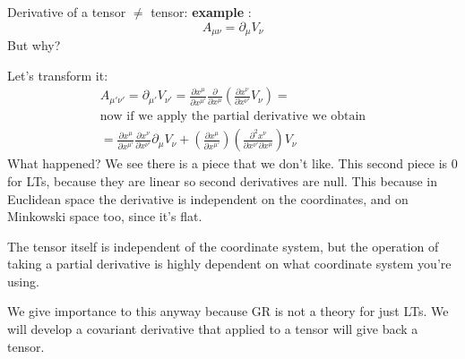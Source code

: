 Derivative of a tensor $\neq$ tensor:
\textbf{example} : 
\[
A_{\mu \nu } = \partial_{\mu }V_{\nu }
\]
But why? \par
Let's transform it:
\begin{gather*}
A_{\mu '\nu '} = \partial_{\mu '}V_{\nu '} = \frac{\partial x^{\mu }}{\partial x^{\mu '}} \frac{\partial }{\partial x^{\mu }} \left( \frac{\partial x^{\nu }}{\partial x^{\nu '}}V_{\nu }  \right) = \\
\text{now if we apply the partial derivative we obtain}\\
= \frac{\partial x^{\mu }}{\partial x^{\mu '}} \frac{\partial x^{\nu }}{\partial x^{\nu '}} \partial_{\mu } V_{\nu } + \left( \frac{\partial x^{\mu }}{\partial x^{\mu '}}  \right)\left( \frac{\partial^{2}x^{\nu }}{\partial x^{\nu '}\partial x^{\mu }}  \right)V_{\nu }
\end{gather*}
What happened? We see there is a piece that we don't like. This second piece is 0 for LTs, because they are linear so second derivatives are null. This because in Euclidean space the derivative is independent on the coordinates, and on Minkowski space too, since it's flat. \par
The tensor itself is independent of the coordinate system, but the operation of taking a partial derivative is highly dependent on what coordinate system you're using.\par
We give importance to this anyway because GR is not a theory for just LTs.
We will develop a covariant derivative that applied to a tensor will give back a tensor.

